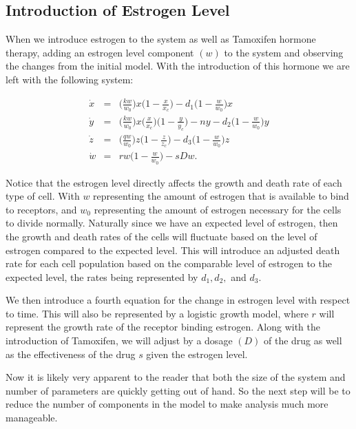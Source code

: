 \documentclass[12pt]{article}
\begin{document}
\subsection{Introduction of Estrogen Level}
\indent\indent When we introduce estrogen to the system as well as Tamoxifen hormone therapy, adding an estrogen level component $(w)$ to the system and observing the changes from the initial model.  With the introduction of this hormone we are left with the following system:

\begin{eqnarray*}
    \Dot{x} & = & \Big( \frac{kw}{w_0}\Big) x\Big( 1-\frac{x}{x_c}\Big) - d_1\Big( 1- \frac{w}{w_0}\Big)x\\
    \Dot{y} & = & \Big( \frac{kw}{w_0}\Big) x\Big( \frac{x}{x_c}\Big)\Big( 1-\frac{y}{y_c}\Big) - ny - d_2\Big( 1- \frac{w}{w_0}\Big)y\\
    \Dot{z} & = & \Big( \frac{qw}{w_0}\Big) z\Big( 1-\frac{z}{z_c}\Big) - d_3\Big( 1- \frac{w}{w_0}\Big)z\\
    \Dot{w} & = & rw\Big(1 - \frac{w}{w_0}\Big) - sDw .
\end{eqnarray*}

Notice that the estrogen level directly affects the growth and death rate of each type of cell.  With $w$ representing the amount of estrogen that is available to bind to receptors, and $w_0$ representing the amount of estrogen necessary for the cells to divide normally.  Naturally since we have an expected level of estrogen, then the growth and death rates of the cells will fluctuate based on the level of estrogen compared to the expected level.  This will introduce an adjusted death rate for each cell population based on the comparable level of estrogen to the expected level, the rates being represented by $d_1, d_2,$ and $d_3$.

We then introduce a fourth equation for the change in estrogen level with respect to time. This will also be represented by a logistic growth model, where $r$ will represent the growth rate of the receptor binding estrogen.  Along with the introduction of Tamoxifen, we will adjust by a dosage $(D)$ of the drug as well as the effectiveness of the drug $s$ given the estrogen level. 

Now it is likely very apparent to the reader that both the size of the system and number of parameters are quickly getting out of hand.  So the next step will be to reduce the number of components in the model to make analysis much more manageable.
\end{document}
